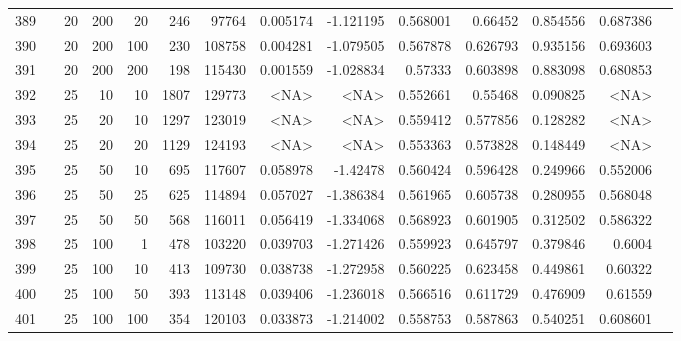 \begin{longtable}{llrrrrrrrrrrrr}
		389 & &           20 &               200 &           20 &         246 &      97764 &  0.005174 & -1.121195 &  0.568001 &     0.66452 &       0.854556 &  0.687386 \\
		390 & &           20 &               200 &          100 &         230 &     108758 &  0.004281 & -1.079505 &  0.567878 &    0.626793 &       0.935156 &  0.693603 \\
		391 & &           20 &               200 &          200 &         198 &     115430 &  0.001559 & -1.028834 &   0.57333 &    0.603898 &       0.883098 &  0.680853 \\
		392 & &           25 &                10 &           10 &           1807 &     129773 &      <NA> &      <NA> &  0.552661 &     0.55468 &       0.090825 &  <NA> \\
		393 & &           25 &                20 &           10 &           1297 &     123019 &      <NA> &      <NA> &  0.559412 &    0.577856 &       0.128282 &  <NA> \\
		394 & &           25 &                20 &           20 &           1129 &     124193 &      <NA> &      <NA> &  0.553363 &    0.573828 &       0.148449 &  <NA> \\
		395 & &           25 &                50 &           10 &         695 &     117607 &  0.058978 &  -1.42478 &  0.560424 &    0.596428 &       0.249966 &  0.552006 \\
		396 & &           25 &                50 &           25 &         625 &     114894 &  0.057027 & -1.386384 &  0.561965 &    0.605738 &       0.280955 &  0.568048 \\
		397 & &           25 &                50 &           50 &         568 &     116011 &  0.056419 & -1.334068 &  0.568923 &    0.601905 &       0.312502 &  0.586322 \\
		398 & &           25 &               100 &            1 &         478 &     103220 &  0.039703 & -1.271426 &  0.559923 &    0.645797 &       0.379846 &    0.6004 \\
		399 & &           25 &               100 &           10 &         413 &     109730 &  0.038738 & -1.272958 &  0.560225 &    0.623458 &       0.449861 &   0.60322 \\
		400 & &           25 &               100 &           50 &         393 &     113148 &  0.039406 & -1.236018 &  0.566516 &    0.611729 &       0.476909 &   0.61559 \\
		401 & &           25 &               100 &          100 &         354 &     120103 &  0.033873 & -1.214002 &  0.558753 &    0.587863 &       0.540251 &  0.608601 \\

\end{longtable}
